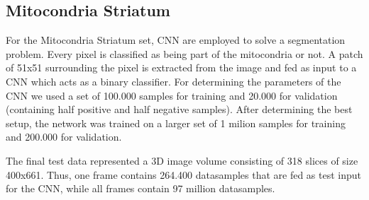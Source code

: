 \subsection{Mitocondria Striatum}
For the Mitocondria Striatum set, CNN are employed to solve a segmentation problem. Every pixel is classified as being part of the mitocondria or not. A patch of 51x51 surrounding the pixel is extracted from the image and fed as input to a CNN which acts as a binary classifier. For determining the parameters of the CNN we used a set of
100.000 samples for training and 20.000 for validation (containing half positive and half negative samples). After determining the best setup, the network was trained on a larger set of 1 milion samples for training and 200.000 for validation.

The final test data represented a 3D image volume consisting of 318 slices of size 400x661. Thus, one frame contains 264.400 datasamples that are fed as test input for the CNN, while all frames contain 97 million datasamples.

